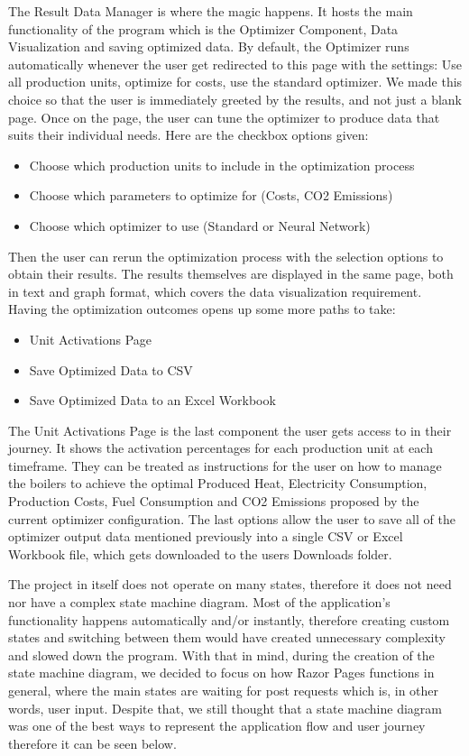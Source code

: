 \documentclass[12pt]{report}
\begin{document}
The Result Data Manager is where the magic happens. It hosts the main functionality of the program which is the Optimizer Component, Data Visualization and saving optimized data.
By default, the Optimizer runs automatically whenever the user get redirected to this page with the settings: Use all production units,
optimize for costs, use the standard optimizer. We made this choice so that the user is immediately greeted by the results, and not just a blank page.
Once on the page, the user can tune the optimizer to produce data that suits their individual needs. Here are the checkbox options given:
\begin{itemize}
  \item Choose which production units to include in the optimization process
  \item Choose which parameters to optimize for (Costs, CO2 Emissions)
  \item Choose which optimizer to use (Standard or Neural Network)
\end{itemize}
Then the user can rerun the optimization process with the selection options to obtain their results. The results themselves are displayed in the same page,
both in text and graph format, which covers the data visualization requirement. Having the optimization outcomes opens up some more paths to take:
\begin{itemize}
  \item Unit Activations Page
  \item Save Optimized Data to CSV
  \item Save Optimized Data to an Excel Workbook
\end{itemize}
The Unit Activations Page is the last component the user gets access to in their journey. It shows the activation percentages for each production unit at each timeframe.
They can be treated as instructions for the user on how to manage the boilers to achieve the optimal Produced Heat, Electricity Consumption, Production Costs, 
Fuel Consumption and CO2 Emissions proposed by the current optimizer configuration.
The last options allow the user to save all of the optimizer output data mentioned previously into a single CSV or Excel Workbook file, which gets
downloaded to the users Downloads folder.


The project in itself does not operate on many states, therefore it does not need nor have a complex state machine diagram.
Most of the application's functionality happens automatically and/or instantly, therefore creating custom states and switching between them
would have created unnecessary complexity and slowed down the program. With that in mind, during the creation of the state machine diagram,
we decided to focus on how Razor Pages functions in general, where the main states are waiting for post requests which is, in other words, user input.
Despite that, we still thought that a state machine diagram was one of the best ways to represent the application flow and user journey
therefore it can be seen below.
\end{document}
